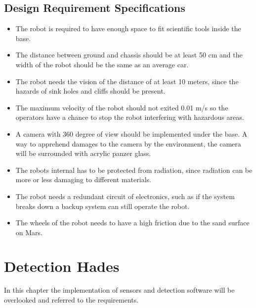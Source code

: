 \section{Design Requirement Specifications} \label{ch:Designrequiremnts}
\begin{itemize}
    \item The robot is required to have enough space to fit scientific tools inside the base. 
    \item The distance between ground and chassis should be at least 50 cm and the width of the robot should be the same as an average car. 
    \item The robot needs the vision of the distance of at least 10 meters, since the hazards of sink holes and cliffs should be present.
    \item The maximum velocity of the robot should not exited 0.01 m/s so the operators have a chance to stop the robot interfering with hazardous areas.
    \item A camera with 360 degree of view should be implemented under the base. A way to apprehend damages to the camera by the environment, the camera will be surrounded with acrylic panzer glass\cite{Lidar360}.
    \item The robots internal has to be protected from radiation, since radiation can be more or less damaging to different materials\cite{radiationEffectsInMaterials}.
    \item The robot needs a redundant circuit of electronics, such as if the system breaks down a backup system can still operate the robot.
    \item The wheels of the robot needs to have a high friction due to the sand surface on Mars\cite{sand}.
\end{itemize}

\chapter{Detection Hades} \label{ch:detectionHades}

In this chapter the implementation of sensors and detection software will be overlooked and referred to the requirements.\\

